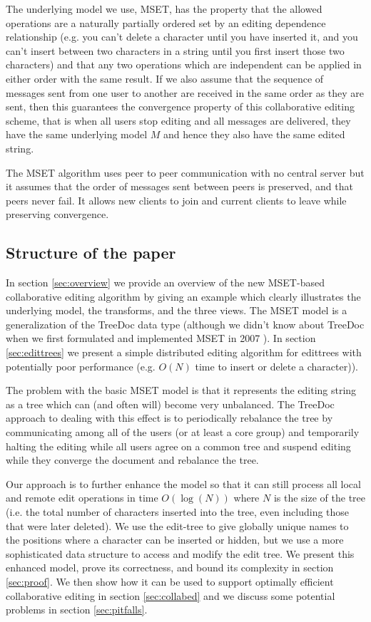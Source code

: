 \documentclass{amsart}
\begin{document}
The underlying model we use, MSET, has the property that the allowed operations are a naturally partially ordered set  by an editing dependence relationship (e.g. you can't delete a character until you have inserted it, and you can't insert between two characters in a string until you first insert those two characters)
and that any two operations which are independent can be applied in either order with the same result.  If we also assume that the sequence of messages sent from one user to another are received in the same order as they are sent, then this guarantees the convergence property of this collaborative editing scheme, that is when all users stop editing and all messages are delivered, they have the same underlying model $M$ and hence they also have the same edited string.

The MSET algorithm uses peer to peer communication with no central server but it assumes that  the order of messages sent between peers is preserved, and that peers never fail. It allows new clients to join and current clients to leave while preserving convergence. 

\subsection{Structure of the paper}

In section \ref{sec:overview} we provide an overview of the new MSET-based
collaborative editing algorithm by giving an example which clearly illustrates
the underlying model, the transforms, and the three views. The MSET model is a generalization of the TreeDoc data type (although we didn't know about TreeDoc when we first formulated and implemented MSET in 2007 \cite{granville_collabed_2007}). In section \ref{sec:edittrees} we present a simple distributed editing algorithm for edittrees with potentially poor performance (e.g. $O(N)$ time to insert or delete a character)).

The problem with the basic MSET model is that it represents the editing string as a tree which can (and often will) become very unbalanced.  The TreeDoc approach to dealing with this effect is to periodically rebalance the tree by communicating among all of the users (or at least a core group) and temporarily halting the editing while all users agree on a common tree and suspend editing while they converge the document and rebalance the tree.

Our approach is to further enhance the model so that it can still process all local and remote edit operations in time $O(\log(N))$ where $N$ is the size of the tree (i.e. the total number of characters inserted into the tree, even including those that were later deleted). We use the edit-tree to give globally unique names to the positions where a character can be inserted or hidden, but we use a more sophisticated data structure to access and modify the edit tree.
We present this enhanced model, prove its correctness, and bound its complexity
in section \ref{sec:proof}. We then show how it can be used to support optimally efficient collaborative editing in section \ref{sec:collabed} and we discuss some potential problems in section \ref{sec:pitfalls}.
\end{document}
